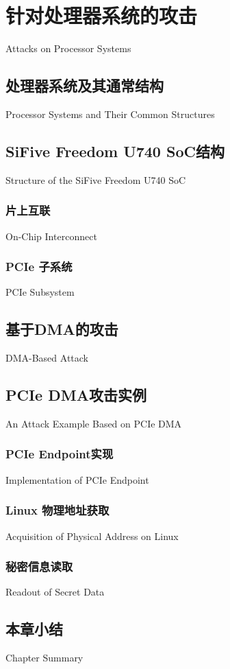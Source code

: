 
\chapter{针对处理器系统的攻击}{Attacks on Processor Systems}


\section{处理器系统及其通常结构}{Processor Systems and Their Common Structures}
\somewords


\section{SiFive Freedom U740 SoC结构}{Structure of the SiFive Freedom U740 SoC}
\somewords
\subsection{片上互联}{On-Chip Interconnect}
\somewords
\subsection{PCIe 子系统}{PCIe Subsystem}
\somewords


\section{基于DMA的攻击}{DMA-Based Attack}
\somewords


\section{PCIe DMA攻击实例}{An Attack Example Based on PCIe DMA}
\somewords
\subsection{PCIe Endpoint实现}{Implementation of PCIe Endpoint}
\somewords
\subsection{Linux 物理地址获取}{Acquisition of Physical Address on Linux}
\somewords
\subsection{秘密信息读取}{Readout of Secret Data}
\somewords

\section{本章小结}{Chapter Summary}
\somewords


\newpage
